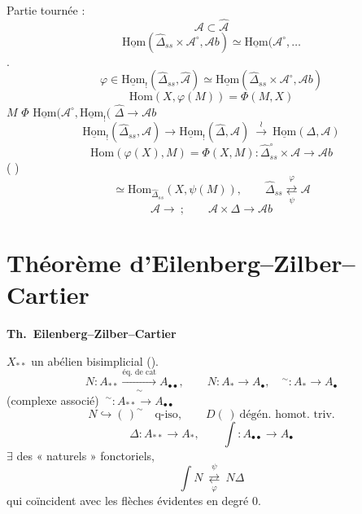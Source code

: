 \documentclass[11pt,a4paper]{article}
\begin{document}
Partie tournée :
\[
\mathcal{A} \subset \hat{\mathcal{A}}
\]
\[
\underline{\mathrm{Hom}}(\hat{\Delta}_{ss} \times \mathcal{A}^\circ , \mathcal{A}b) \simeq \underline{\mathrm{Hom}}(\mathcal{A}^\circ , \ldots
\]
\ill{}
 \ill{}.
\[
\varphi \in \underline{\mathrm{Hom}}_!(\hat{\Delta}_{ss} , \hat{\mathcal{A}}) \simeq \underline{\mathrm{Hom}}(\hat{\Delta}_{ss} \times \mathcal{A}^\circ , \mathcal{A}b)
\]
\[
\mathrm{Hom}(X , \varphi(M)) = \Phi(M , X)
\]
 \ill{} $M$
 \quad $\Phi$ \quad $\underline{\mathrm{Hom}}(\mathcal{A}^\circ , \underline{\mathrm{Hom}}_!($\ill{} \quad $\hat{\Delta} \longrightarrow \mathcal{A}b$
\[
\underline{\mathrm{Hom}}_!(\hat{\Delta}_{ss} , \mathcal{A}) \longrightarrow \underline{\mathrm{Hom}}_!(\hat{\Delta} , \mathcal{A})
\ \overset{\wr}{\longrightarrow} \ \underline{\mathrm{Hom}}(\Delta , \mathcal{A})
\]
\[
\mathrm{Hom}(\varphi(X) , M) = \Phi(X , M) : \hat{\Delta}_{ss}^\circ \times \mathcal{A} \longrightarrow \mathcal{A}b
\]
( \ill{}  \ill{} )
\[
\simeq \mathrm{Hom}_{\hat{\Delta}_{ss}}(X , \psi(M)) ,
\qquad
\hat{\Delta}_{ss} \overset{\varphi}{\underset{\psi}{\rightleftarrows}} \mathcal{A}
\]
\[
\mathcal{A} \longrightarrow \ ; \qquad \mathcal{A} \times \Delta \longrightarrow \mathcal{A}b
\]

\section{Théorème d’Eilenberg--Zilber--Cartier}


\textbf{Th.\ Eilenberg--Zilber--Cartier}

$X_{**}$ un   abélien bisimplicial (\ill{}).
\[
N \colon A_{**} \xrightarrow[\;\sim\;]{\text{éq.\ de cat}} A_{\bullet\bullet} ,
\qquad
N \colon A_* \to A_\bullet , \quad {}^\sim \colon A_* \to A_\bullet
\]
(complexe associé) $\ {}^\sim \colon A_{**} \longrightarrow A_{\bullet\bullet}$
\[
N \hookrightarrow (\,)^\sim \quad \text{q-iso} , \qquad D(\,) \ \text{dégén.\ homot.\ triv.}
\]
\[
\Delta \colon A_{**} \longrightarrow A_* , \qquad \int \colon A_{\bullet\bullet} \longrightarrow A_\bullet
\]
$\exists$ des   « naturels » fonctoriels,
\[
\int N \ \overset{\psi}{\underset{\varphi}{\rightleftarrows}} \ N \Delta
\]
qui coïncident avec les flèches évidentes en degré 0.
\end{document}
